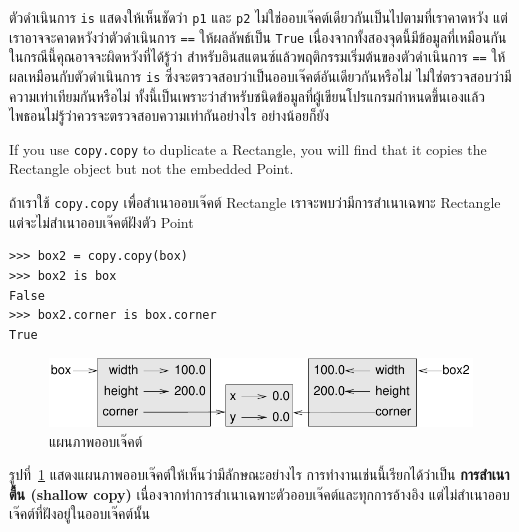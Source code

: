 ตัวดำเนินการ {\tt is} แสดงให้เห็นชัดว่า {\tt p1} และ {\tt p2} ไม่ใช่ออบเจ๊คต์เดียวกันเป็นไปตามที่เราคาดหวัง 
แต่เราอาจจะคาดหวังว่าตัวดำเนินการ {\tt ==} ให้ผลลัพธ์เป็น {\tt True} เนื่องจากทั้งสองจุดนี้มีข้อมูลที่เหมือนกัน 
ในกรณีนี้คุณอาจจะผิดหวังที่ได้รู้ว่า สำหรับอินสแตนซ์แล้วพฤติกรรมเริ่มต้นของตัวดำเนินการ {\tt ==} ให้ผลเหมือนกับตัวดำเนินการ {\tt is} 
ซึ่งจะตรวจสอบว่าเป็นออบเจ๊คต์อันเดียวกันหรือไม่ ไม่ใช่ตรวจสอบว่ามีความเท่าเทียมกันหรือไม่ 
ทั้งนี้เป็นเพราะว่าสำหรับชนิดข้อมูลที่ผู้เขียนโปรแกรมกำหนดขึ้นเองแล้วไพธอนไม่รู้ว่าควรจะตรวจสอบความเท่ากันอย่างไร อย่างน้อยก็ยัง


If you use {\tt copy.copy} to duplicate a Rectangle, you will find
that it copies the Rectangle object but not the embedded Point.

ถ้าเราใช้ {\tt copy.copy} เพื่อสำเนาออบเจ๊คต์ Rectangle เราจะพบว่ามีการสำเนาเฉพาะ Rectangle แต่จะไม่สำเนาออบเจ๊คต์ฝังตัว Point

\begin{verbatim}
>>> box2 = copy.copy(box)
>>> box2 is box
False
>>> box2.corner is box.corner
True
\end{verbatim}

\begin{figure}
\centerline
{\includegraphics[scale=0.8]{figs/rectangle2.pdf}}
\caption{แผนภาพออบเจ๊คต์}
\label{fig.rectangle2}
\end{figure}



รูปที่~\ref{fig.rectangle2} แสดงแผนภาพออบเจ๊คต์ให้เห็นว่ามีลักษณะอย่างไร 
การทำงานเช่นนี้เรียกได้ว่าเป็น {\bf การสำเนาตื้น (shallow copy)} เนื่องจากทำการสำเนาเฉพาะตัวออบเจ๊คต์และทุกการอ้างอิง แต่ไม่สำเนาออบเจ๊คต์ที่ฝังอยู่ในออบเจ๊คต์นั้น

